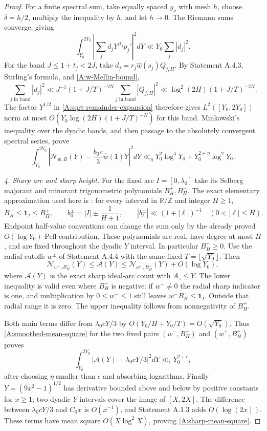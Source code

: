 \begin{proof}
For a finite spectral sum, take equally spaced $y_\nu$ with
mesh $h$, choose $\delta=h/2$, multiply the inequality by $h$,
and let $h\to0$. The Riemann sums converge, giving
\begin{equation}\label{A:continuous-large-sieve}
 \int_{Y_0}^{2Y_0}
       \left|\sum_jd_jY^{it_j}p_j'\right|^2dY
       \ll Y_0\sum_j|d_j|^2.
\end{equation}
For the band $J\leq1+t_j<2J$, take
$d_j=r_j\widehat w(s_j)Q_{j,H}$.
By Statement A.4.3, Stirling's formula, and
\eqref{A:w-Mellin-bound},
\[
 \sum_{j\text{ in band}}|d_j|^2
 \ll J^{-1}(1+J/T)^{-2N}\sum_{j\text{ in band}}|Q_{j,H}|^2
 \ll\log^2(2H)(1+J/T)^{-2N}.
\]
The factor $Y^{1/2}$ in \eqref{A:sqrt-remainder-expansion}
therefore gives $L^2([Y_0,2Y_0])$ norm at most
$O(Y_0\log(2H)(1+J/T)^{-N})$ for this band.
Minkowski's inequality over the dyadic bands, and then passage
to the absolutely convergent spectral series, prove
\begin{equation}\label{A:smoothed-mean-square}
 \int_{Y_0}^{2Y_0}
 \left|\mathcal N_{w,B}(Y)-\frac{b_0c}{3}\widehat w(1)Y\right|^2dY
 \ll_\eta Y_0^2\log^4Y_0+Y_0^{2+\eta}\log^2Y_0.
\end{equation}

\emph{4. Sharp arc and sharp height.}
For the fixed arc $I=[0,\lambda_0]$ take its Selberg majorant
and minorant trigonometric polynomials $B_H^+,B_H^-$.
The exact elementary approximation used here is
\cite[equation (4.11)]{LesterMatomakiRadziwill2015}:
for every interval in $\mathbb R/\mathbb Z$ and integer $H\geq1$,
\[
 B_H^-\leq\mathbf1_I\leq B_H^+,\qquad
 b_0^\pm=|I|\pm\frac1{H+1},\qquad
 |b_\ell^\pm|\ll(1+|\ell|)^{-1}\quad(0<|\ell|\leq H).
\]
Endpoint half-value conventions can change the sum only by the
already proved $O(\log Y_0)$ Pell contribution.
These polynomials are real, have degree at most $H$, and are
fixed throughout the dyadic $Y$ interval. In particular $B_H^+\geq0$.
Use the radial cutoffs $w^\pm$ of Statement A.4.4 with the same
fixed $T=\lfloor\sqrt{Y_0}\rfloor$. Then
\[
 \mathcal N_{w^-,B_H^-}(Y)
 \leq\mathcal A(Y)
 \leq\mathcal N_{w^+,B_H^+}(Y)+O(\log Y_0),
\]
where $\mathcal A(Y)$ is the exact sharp ideal-arc count with
$A_z\leq Y$. The lower inequality is valid even where
$B_H^-$ is negative: if $w^-\ne0$ the radial sharp indicator
is one, and multiplication by $0\leq w^-\leq1$ still leaves
$w^-B_H^-\leq\mathbf1_I$. Outside that radial range it is zero.
The upper inequality follows from nonnegativity of $B_H^+$.

Both main terms differ from $\lambda_0cY/3$ by
$O(Y_0/H+Y_0/T)=O(\sqrt{Y_0})$.
Thus \eqref{A:smoothed-mean-square} for the two fixed pairs
$(w^-,B_H^-)$ and $(w^+,B_H^+)$ proves
\[
 \int_{Y_0}^{2Y_0}|\mathcal A(Y)-\lambda_0cY/3|^2dY
       \ll_\epsilon Y_0^{2+\epsilon},
\]
after choosing $\eta$ smaller than $\epsilon$ and absorbing
logarithms. Finally $Y=(9x^2-1)^{1/2}$ has derivative bounded
above and below by positive constants for $x\geq1$;
two dyadic $Y$ intervals cover the image of $[X,2X]$.
The difference between $\lambda_0cY/3$ and $C_0x$ is
$O(x^{-1})$, and Statement A.1.3 adds $O(\log(2x))$.
These terms have mean square $O(X\log^2X)$, proving
\eqref{A:sharp-mean-square}.
\end{proof}


